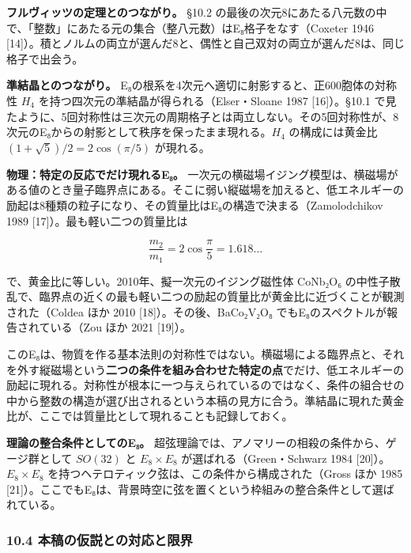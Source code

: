 \documentclass[
  a4paper,
]{ltjsarticle}
\begin{document}
\textbf{フルヴィッツの定理とのつながり。} §10.2
の最後の次元8にあたる八元数の中で、「整数」にあたる元の集合（整八元数）はE₈格子をなす（Coxeter
1946
{[}14{]}）。積とノルムの両立が選んだ8と、偶性と自己双対の両立が選んだ8は、同じ格子で出会う。

\textbf{準結晶とのつながり。}
E₈の根系を4次元へ適切に射影すると、正600胞体の対称性 \(H_4\)
を持つ四次元の準結晶が得られる（Elser・Sloane 1987 {[}16{]}）。§10.1
で見たように、5回対称性は三次元の周期格子とは両立しない。その5回対称性が、8次元のE₈からの射影として秩序を保ったまま現れる。\(H_4\)
の構成には黄金比 \((1+\sqrt5)/2=2\cos(\pi/5)\) が現れる。

\textbf{物理：特定の反応でだけ現れるE₈。}
一次元の横磁場イジング模型は、横磁場がある値のとき量子臨界点にある。そこに弱い縦磁場を加えると、低エネルギーの励起は8種類の粒子になり、その質量比はE₈の構造で決まる（Zamolodchikov
1989 {[}17{]}）。最も軽い二つの質量比は

\[
\frac{m_2}{m_1}=2\cos\frac{\pi}{5}=1.618\ldots
\tag{16}
\]

で、黄金比に等しい。2010年、擬一次元のイジング磁性体 CoNb₂O₆
の中性子散乱で、臨界点の近くの最も軽い二つの励起の質量比が黄金比に近づくことが観測された（Coldea
ほか 2010 {[}18{]}）。その後、BaCo₂V₂O₈
でもE₈のスペクトルが報告されている（Zou ほか 2021 {[}19{]}）。

このE₈は、物質を作る基本法則の対称性ではない。横磁場による臨界点と、それを外す縦磁場という\textbf{二つの条件を組み合わせた特定の点}でだけ、低エネルギーの励起に現れる。対称性が根本に一つ与えられているのではなく、条件の組合せの中から整数の構造が選び出されるという本稿の見方に合う。準結晶に現れた黄金比が、ここでは質量比として現れることも記録しておく。

\textbf{理論の整合条件としてのE₈。}
超弦理論では、アノマリーの相殺の条件から、ゲージ群として \(SO(32)\) と
\(E_8\times E_8\) が選ばれる（Green・Schwarz 1984
{[}20{]}）。\(E_8\times E_8\)
を持つヘテロティック弦は、この条件から構成された（Gross ほか 1985
{[}21{]}）。ここでもE₈は、背景時空に弦を置くという枠組みの整合条件として選ばれている。

\subsubsection{10.4
本稿の仮説との対応と限界}\label{ux672cux7a3fux306eux4eeeux8aacux3068ux306eux5bfeux5fdcux3068ux9650ux754c}
\end{document}
